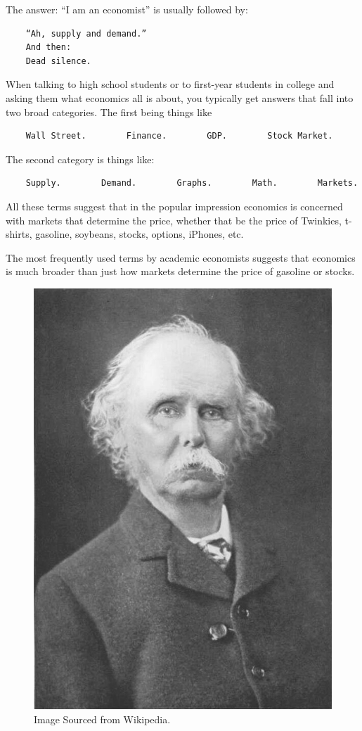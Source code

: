 \documentclass[
]{book}
\begin{document}
The answer: ``I am an economist'' is usually followed by:

\begin{verbatim}
    “Ah, supply and demand.”
    And then:
    Dead silence.
\end{verbatim}

When talking to high school students or to first-year students in college and asking them what economics all is about, you typically get answers that fall into two broad categories. The first being things like

\begin{verbatim}
    Wall Street.        Finance.        GDP.        Stock Market.
\end{verbatim}

The second category is things like:

\begin{verbatim}
    Supply.        Demand.        Graphs.        Math.        Markets.
\end{verbatim}

All these terms suggest that in the popular impression economics is concerned with markets that determine the price, whether that be the price of Twinkies, t-shirts, gasoline, soybeans, stocks, options, iPhones, etc.

The most frequently used terms by academic economists suggests that economics is much broader than just how markets determine the price of gasoline or stocks.

\begin{figure}
\includegraphics[width=0.5\linewidth]{img/ch0/Alfred_Marshall} \caption{Image Sourced from Wikipedia.}\label{fig:fig002}
\end{figure}
\end{document}

